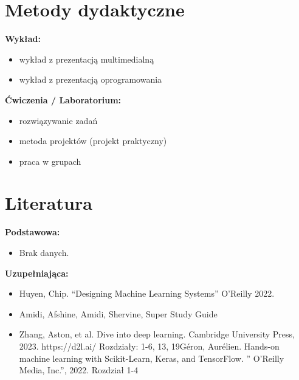 \documentclass[12pt, a4paper]{article}
\begin{document}
\section{Metody dydaktyczne}

\textbf{Wykład:}
\begin{itemize}
  \item wykład z prezentacją multimedialną
  \item wykład z prezentacją oprogramowania
\end{itemize}
\vspace{4pt}
\textbf{Ćwiczenia / Laboratorium:}
\begin{itemize}
  \item rozwiązywanie zadań
  \item metoda projektów (projekt praktyczny)
  \item praca w grupach
\end{itemize}
\vspace{4pt}


\section{Literatura}

\textbf{Podstawowa:}
\begin{itemize}
  \item Brak danych.
\end{itemize}

\textbf{Uzupełniająca:}
\begin{itemize}
  \item Huyen, Chip. “Designing Machine Learning Systems” O’Reilly 2022.
  \item Amidi, Afshine, Amidi, Shervine, Super Study Guide
  \item Zhang, Aston, et al. Dive into deep learning. Cambridge University Press, 2023. https://d2l.ai/ Rozdziały: 1-6, 13, 19Géron, Aurélien. Hands-on machine learning with Scikit-Learn, Keras, and TensorFlow. '' O'Reilly Media, Inc.'', 2022.  Rozdział 1-4
\end{itemize}
\end{document}
